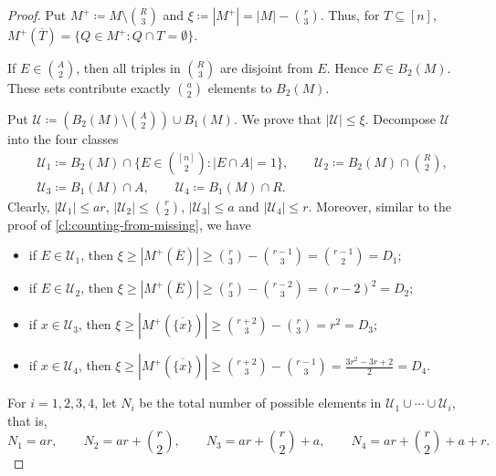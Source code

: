 \documentclass[10pt,a4paper]{article}
\numberwithin{equation}{section}
\theoremstyle{definition}
\newtheorem{claim}[claim]{Claim}
\begin{document}

\begin{proof}
    Put
    \(M^+\coloneqq M\setminus\binom R3\) and \(\xi\coloneqq |M^+|=|M|-\binom r3\).
    Thus, for \(T\subseteq[n]\),
    \(M^+(\overline T)=\{Q\in M^+:Q\cap T=\emptyset\}.\)

    If \(E\in\binom A2\), then all triples in \(\binom R3\) are disjoint
    from \(E\).  Hence \(E\in B_2(M)\).  These sets contribute exactly
    \(\binom a2\) elements to \(B_2(M)\).

    Put
    \(\mathcal U \coloneqq \left(B_2(M)\setminus\binom A2\right)\cup B_1(M).\)
    We prove that \(|\mathcal U|\le\xi\).  Decompose \(\mathcal U\) into
    the four classes
    \[
        \begin{aligned}
             & \mathcal U_1\coloneqq B_2(M)\cap\{E\in\binom{[n]}2: |E\cap A|=1\}, \qquad
            \mathcal U_2\coloneqq B_2(M)\cap\binom R2,                                   \\
             & \mathcal U_3\coloneqq B_1(M)\cap A, \qquad  \mathcal U_4
            \coloneqq B_1(M)\cap R .
        \end{aligned}
    \]
    Clearly, $|\mathcal U_1|\le ar$, $|\mathcal U_2|\le\binom r2$, $|\mathcal U_3|\le a$ and $|\mathcal U_4|\le r$.
    Moreover, similar to the proof of \cref{cl:counting-from-missing}, we have
    \begin{itemize}
        \item if \(E\in\mathcal U_1\), then $\xi\ge |M^+(\overline E)|\ge\binom r3-\binom{r-1}3=\binom{r-1}{2}=D_1$;
        \item if \(E\in\mathcal U_2\), then $\xi\ge |M^+(\overline E)|\ge\binom r3-\binom{r-2}3=(r-2)^2=D_2$;
        \item if \(x\in\mathcal U_3\), then $\xi\ge |M^+(\overline{\{x\}})|
                  \ge \binom{r+2}3-\binom r3=r^2=D_3$;
        \item if \(x\in\mathcal U_4\), then $\xi\ge |M^+(\overline{\{x\}})|
                  \ge\binom{r+2}3-\binom{r-1}3=\frac{3r^2-3r+2}{2}=D_4$.
    \end{itemize}
    For \(i=1,2,3,4\), let $N_i$ be the total number of possible elements in \(\mathcal U_1\cup\cdots\cup\mathcal U_i\), that is,
    \[
        N_1=ar,
        \qquad
        N_2=ar+\binom r2,
        \qquad
        N_3=ar+\binom r2+a,
        \qquad
        N_4=ar+\binom r2+a+r.
    \]


\end{proof}
\end{document}
